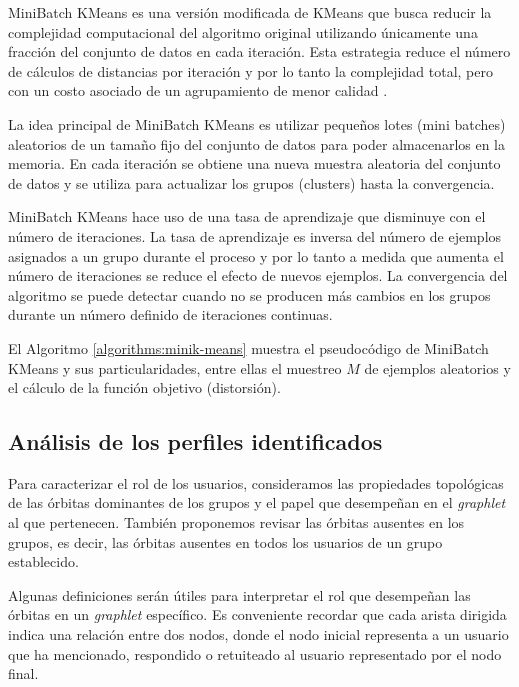 MiniBatch KMeans \cite{sculley_web-scale_2010} es una versión modificada de KMeans que busca reducir la complejidad computacional del algoritmo original utilizando únicamente una fracción del conjunto de datos en cada iteración. Esta estrategia reduce el número de cálculos de distancias por iteración y por lo tanto la complejidad total, pero con un costo asociado de un agrupamiento de menor calidad \cite{bejar_k-means_nodate}.

La idea principal de MiniBatch KMeans es utilizar pequeños lotes (mini batches) aleatorios de un tamaño fijo del conjunto de datos para poder almacenarlos en la memoria. En cada iteración se obtiene una nueva muestra aleatoria del conjunto de datos y se utiliza para actualizar los grupos (clusters) hasta la convergencia. 

MiniBatch KMeans hace uso de una tasa de aprendizaje que disminuye con el número de iteraciones. La tasa de aprendizaje es inversa del número de ejemplos asignados a un grupo durante el proceso y por lo tanto a medida que aumenta el número de iteraciones se reduce el efecto de nuevos ejemplos. La convergencia del algoritmo se puede detectar cuando no se producen más cambios en los grupos durante un número definido de iteraciones continuas. 

El Algoritmo \ref{algorithms:minik-means} muestra el pseudocódigo de MiniBatch KMeans y sus particularidades, entre ellas el muestreo $M$ de ejemplos aleatorios y el cálculo de la función objetivo (distorsión).

\label{algorithms:minik-means}

\subsection{Análisis de los perfiles identificados}
Para caracterizar el rol de los usuarios, consideramos las propiedades topológicas de las órbitas dominantes de los grupos y el papel que desempeñan en el \textit{graphlet} al que pertenecen. También proponemos revisar las órbitas ausentes en los grupos, es decir, las órbitas ausentes en todos los usuarios de un grupo establecido.

Algunas definiciones serán útiles para interpretar el rol que desempeñan las órbitas en un \textit{graphlet} específico. Es conveniente recordar que cada arista dirigida indica una relación entre dos nodos, donde el nodo inicial representa a un usuario que ha mencionado, respondido o retuiteado al usuario representado por el nodo final. 

